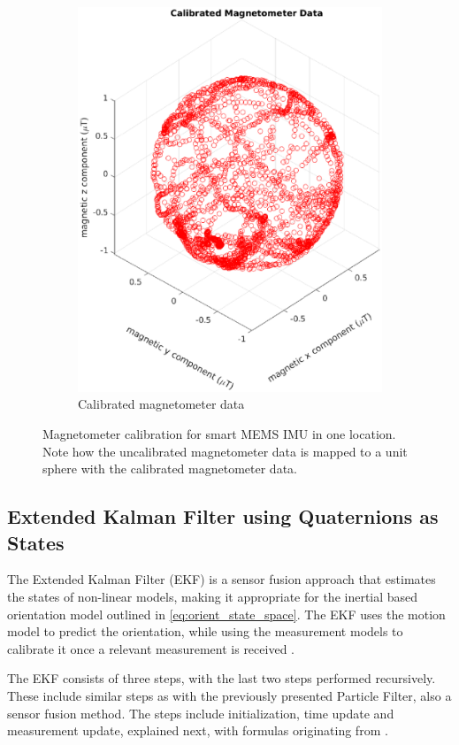 \begin{figure}[H]
\begin{subfigure}[t]{0.45\textwidth}
		\includegraphics[trim=80 0 80 0, clip,width=1.1\linewidth]{images/20201020_1125_Calibrated_Magnetometer_Data}
		\caption{ Calibrated magnetometer data}
		\label{fig:calibrated_magnetometer_data}
	\end{subfigure}
	\caption{Magnetometer calibration for smart MEMS \ac{IMU} in one location. Note how the uncalibrated magnetometer data is mapped to a unit sphere with the calibrated magnetometer data.}
	\label{fig:calibration_magnetometer}
\end{figure}



\subsection{Extended Kalman Filter using Quaternions as States}
\label{sec:rw-EKF}

The Extended Kalman Filter (EKF) is a sensor fusion approach that estimates the states of non-linear models, making it appropriate for the inertial based orientation model outlined in \eqref{eq:orient_state_space}. The EKF uses the motion model to predict the orientation, while using the measurement models to calibrate it once a relevant measurement is received \cite{Kok2017}. \par 
The EKF consists of three steps, with the last two steps performed recursively.  These include similar steps as with the previously presented Particle Filter, also a sensor fusion method. The steps include initialization, time update and measurement update, explained next, with formulas originating from \cite{Kok2017}. \par 

